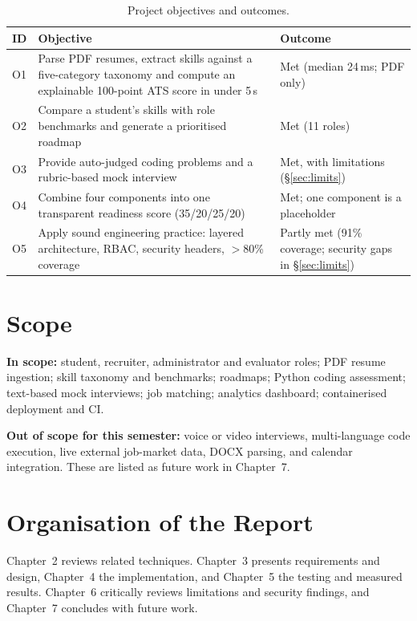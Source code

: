 \documentclass[openany]{tietreport}
\begin{document}
\begin{table}[h]
\centering\small
\begin{tabularx}{\textwidth}{@{}l>{\raggedright\arraybackslash}X>{\raggedright\arraybackslash}p{1.45in}@{}}
\toprule
\textbf{ID} & \textbf{Objective} & \textbf{Outcome} \\
\midrule
O1 & Parse PDF resumes, extract skills against a five-category taxonomy and compute an explainable 100-point ATS score in under 5\,s & Met (median 24\,ms; PDF only) \\
O2 & Compare a student's skills with role benchmarks and generate a prioritised roadmap & Met (11 roles) \\
O3 & Provide auto-judged coding problems and a rubric-based mock interview & Met, with limitations (\S\ref{sec:limits}) \\
O4 & Combine four components into one transparent readiness score (35/20/25/20) & Met; one component is a placeholder \\
O5 & Apply sound engineering practice: layered architecture, RBAC, security headers, $>$80\% coverage & Partly met (91\% coverage; security gaps in \S\ref{sec:limits}) \\
\bottomrule
\end{tabularx}
\caption{Project objectives and outcomes.}
\label{tab:objectives}
\end{table}

\section{Scope}
\textbf{In scope:} student, recruiter, administrator and evaluator roles; PDF resume ingestion; skill taxonomy and benchmarks; roadmaps; Python coding assessment; text-based mock interviews; job matching; analytics dashboard; containerised deployment and CI.

\textbf{Out of scope for this semester:} voice or video interviews, multi-language code execution, live external job-market data, DOCX parsing, and calendar integration. These are listed as future work in Chapter~7.

\section{Organisation of the Report}
Chapter~2 reviews related techniques. Chapter~3 presents requirements and design, Chapter~4 the implementation, and Chapter~5 the testing and measured results. Chapter~6 critically reviews limitations and security findings, and Chapter~7 concludes with future work.
\end{document}
